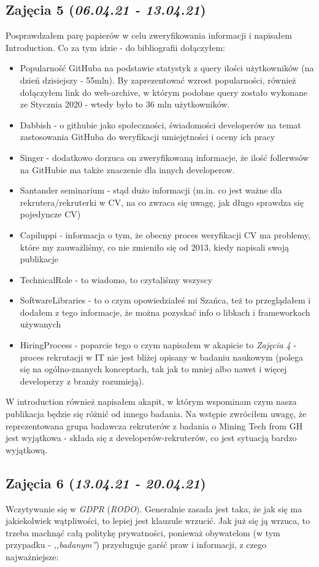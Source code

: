 \documentclass[graybox]{svmult}
\begin{document}
\subsection{Zajęcia 5 (\emph{06.04.21 - 13.04.21})}
Posprawdzałem parę papierów w celu zweryfikowania informacji i napisałem Introduction. Co za tym idzie - do bibliografii dołączyłem:
\begin{itemize}
  \item Popularność GitHuba na podstawie statystyk z query ilości użytkowników (na dzień dzisiejszy - 55mln). By zaprezentować wzrost popularności, również dołączyłem link do web-archive, w którym podobne query zostało wykonane ze Stycznia 2020 - wtedy było to 36 mln użytkowników.
  \item Dabbish - o githubie jako społeczności, świadomości developerów na temat zastosowania GitHuba do weryfikacji umiejętności i oceny ich pracy
  \item Singer - dodatkowo dorzuca on zweryfikowaną informacje, że ilość follerwsów na GitHubie ma także znaczenie dla innych developerow.
  \item Santander seminarium - stąd dużo informacji (m.in. co jest ważne dla rekrutera/rekruterki w CV, na co zwraca się uwagę, jak długo sprawdza się pojedyncze CV)
  \item Capiluppi - informacja o tym, że obecny proces weryfikacji CV ma problemy, które my zauważliśmy, co nie zmieniło się od 2013, kiedy napisali swoją publikacje
  \item TechnicalRole - to wiadomo, to czytaliśmy wszyscy
  \item SoftwareLibraries - to o czym opowiedziałeś mi Szańca, też to przeglądałem i dodałem z tego informacje, że można pozyskać info o libkach i frameworkach używanych
  \item HiringProcess - poparcie tego o czym napisałem w akapicie to \emph{Zajęcia 4} - proces rekrutacji w IT nie jest bliżej opisany w badaniu naukowym (polega się na ogólno-znanych konceptach, tak jak to mniej albo nawet i więcej developerzy z branży rozumieją). 
\end{itemize}

W introduction również napisałem akapit, w którym wspominam czym nasza publikacja będzie się różnić od innego badania. Na wstępie zwróciłem uwagę, że reprezentowana grupa badawcza rekruterów z badania o Mining Tech from GH jest wyjątkowa - składa się z developerów-rekruterów, co jest sytuacją bardzo wyjątkową.

\subsection{Zajęcia 6 (\emph{13.04.21 - 20.04.21})}
Wczytywanie się w \emph{GDPR} (\emph{RODO}). Generalnie zasada jest taka, że jak się ma jakiekolwiek wątpliwości, to lepiej jest klauzule wrzucić. Jak już się ją wrzuca, to trzeba machnąć całą politykę prywatności, ponieważ obywatelom (w tym przypadku - \emph{,,badanym''}) przysługuje garść praw i informacji, z czego najważniejsze:
\end{document}
